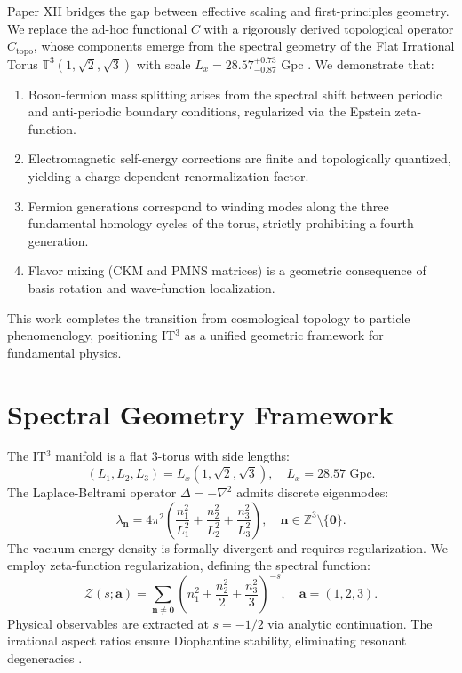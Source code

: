 \documentclass[12pt,a4paper]{article}
\begin{document}
Paper XII bridges the gap between effective scaling and first-principles geometry. We replace the ad-hoc functional $C$ with a rigorously derived topological operator $C_{\text{topo}}$, whose components emerge from the spectral geometry of the Flat Irrational Torus $\mathbb{T}^3(1,\sqrt{2},\sqrt{3})$ with scale $L_x = 28.57^{+0.73}_{-0.87}$ Gpc \cite{PaperI}. We demonstrate that:
\begin{enumerate}
    \item Boson-fermion mass splitting arises from the spectral shift between periodic and anti-periodic boundary conditions, regularized via the Epstein zeta-function.
    \item Electromagnetic self-energy corrections are finite and topologically quantized, yielding a charge-dependent renormalization factor.
    \item Fermion generations correspond to winding modes along the three fundamental homology cycles of the torus, strictly prohibiting a fourth generation.
    \item Flavor mixing (CKM and PMNS matrices) is a geometric consequence of basis rotation and wave-function localization.
\end{enumerate}
This work completes the transition from cosmological topology to particle phenomenology, positioning IT$^3$ as a unified geometric framework for fundamental physics.

\section{Spectral Geometry Framework}
The IT$^3$ manifold is a flat 3-torus with side lengths:
\begin{equation}
    (L_1, L_2, L_3) = L_x (1, \sqrt{2}, \sqrt{3}), \quad L_x = 28.57 \text{ Gpc}.
\end{equation}
The Laplace-Beltrami operator $\Delta = -\nabla^2$ admits discrete eigenmodes:
\begin{equation}
    \lambda_{\mathbf{n}} = 4\pi^2 \left( \frac{n_1^2}{L_1^2} + \frac{n_2^2}{L_2^2} + \frac{n_3^2}{L_3^2} \right), \quad \mathbf{n} \in \mathbb{Z}^3 \setminus \{\mathbf{0}\}.
\end{equation}
The vacuum energy density is formally divergent and requires regularization. We employ zeta-function regularization, defining the spectral function:
\begin{equation}
    \mathcal{Z}(s; \mathbf{a}) = \sum_{\mathbf{n} \neq \mathbf{0}} \left( n_1^2 + \frac{n_2^2}{2} + \frac{n_3^2}{3} \right)^{-s}, \quad \mathbf{a} = (1,2,3).
\end{equation}
Physical observables are extracted at $s = -1/2$ via analytic continuation. The irrational aspect ratios ensure Diophantine stability, eliminating resonant degeneracies \cite{Lutken1986}.
\end{document}

